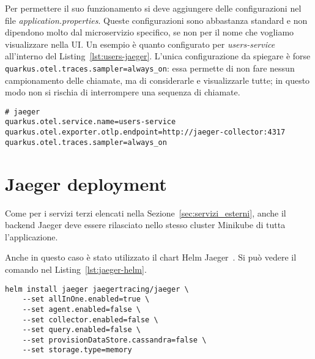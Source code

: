 Per permettere il suo funzionamento si deve aggiungere delle configurazioni nel file \textit{application.properties}. Queste configurazioni sono abbastanza standard e non dipendono molto dal microservizio specifico, se non per il nome che vogliamo visualizzare nella UI. Un esempio è quanto configurato per \textit{users-service} all'interno del Listing~\ref{lst:users-jaeger}. L'unica configurazione da spiegare è forse \texttt{quarkus.otel.traces.sampler=always\_on}: essa permette di non fare nessun campionamento delle chiamate, ma di considerarle e visualizzarle tutte; in questo modo non si rischia di interrompere una sequenza di chiamate.
\begin{lstlisting}[caption=Jaeger configuration for \textit{users-service}, label=lst:users-jaeger]
# jaeger
quarkus.otel.service.name=users-service
quarkus.otel.exporter.otlp.endpoint=http://jaeger-collector:4317
quarkus.otel.traces.sampler=always_on
\end{lstlisting}

\section{Jaeger deployment}
Come per i servizi terzi elencati nella Sezione~\ref{sec:servizi_esterni}, anche il backend Jaeger deve essere rilasciato nello stesso cluster Minikube di tutta l'applicazione.

Anche in questo caso è stato utilizzato il chart Helm Jaeger~\cite{jaeger_helm}. Si può vedere il comando nel Listing~\ref{lst:jaeger-helm}.
\begin{lstlisting}[caption=Install Jaeger chart for \textit{users-service}, label=lst:jaeger-helm]
helm install jaeger jaegertracing/jaeger \
    --set allInOne.enabled=true \
    --set agent.enabled=false \
    --set collector.enabled=false \
    --set query.enabled=false \
    --set provisionDataStore.cassandra=false \
    --set storage.type=memory
\end{lstlisting}